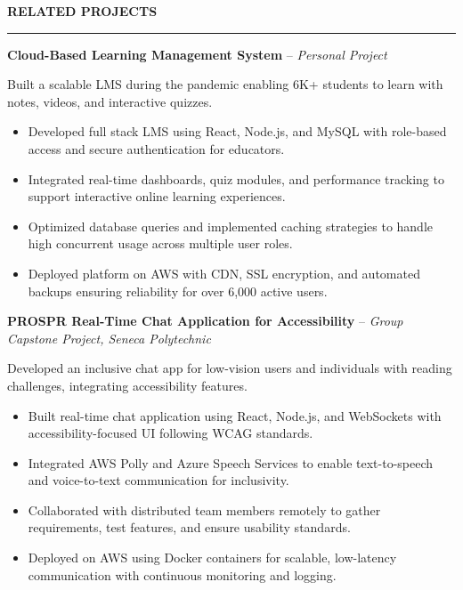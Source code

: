 \documentclass[10pt,letterpaper]{article}
\begin{document}
\vspace{6pt}

\textbf{RELATED PROJECTS}\\[-8pt]
\noindent\rule{\textwidth}{1pt}

\vspace{-2pt}

\textbf{Cloud-Based Learning Management System} -- \emph{Personal Project}

\vspace{-1pt}

Built a scalable LMS during the pandemic enabling 6K+ students to learn with notes, videos, and interactive quizzes.
\vspace{-1pt}
\begin{itemize}
\item Developed full stack LMS using React, Node.js, and MySQL with role-based access and secure authentication for educators.
\item Integrated real-time dashboards, quiz modules, and performance tracking to support interactive online learning experiences.
\item Optimized database queries and implemented caching strategies to handle high concurrent usage across multiple user roles.
\item Deployed platform on AWS with CDN, SSL encryption, and automated backups ensuring reliability for over 6,000 active users.
\end{itemize}

\textbf{PROSPR  Real-Time Chat Application for Accessibility} -- \emph{Group Capstone Project, Seneca Polytechnic}

\vspace{-1pt}

Developed an inclusive chat app for low-vision users and individuals with reading challenges, integrating accessibility features.
\vspace{-1pt}
\begin{itemize}
\item Built real-time chat application using React, Node.js, and WebSockets with accessibility-focused UI following WCAG standards.
\item Integrated AWS Polly and Azure Speech Services to enable text-to-speech and voice-to-text communication for inclusivity.
\item Collaborated with distributed team members remotely to gather requirements, test features, and ensure usability standards.
\item Deployed on AWS using Docker containers for scalable, low-latency communication with continuous monitoring and logging.
\end{itemize}
\end{document}
